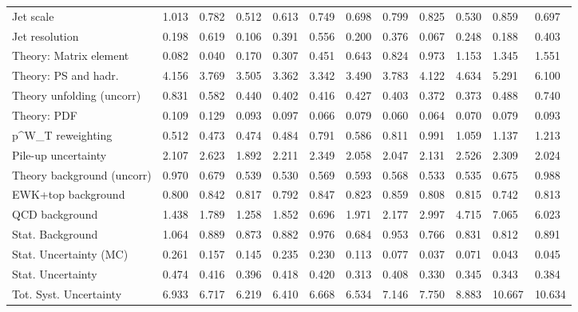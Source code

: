 \begin{tabular}{l|p{0.6cm}p{0.6cm}p{0.6cm}p{0.6cm}p{0.6cm}p{0.6cm}p{0.6cm}p{0.6cm}p{0.6cm}p{0.6cm}p{0.6cm}}
Jet scale                                & 1.013 & 0.782 & 0.512 & 0.613 & 0.749 & 0.698 & 0.799 & 0.825 & 0.530 & 0.859 & 0.697 \\
Jet resolution                           & 0.198 & 0.619 & 0.106 & 0.391 & 0.556 & 0.200 & 0.376 & 0.067 & 0.248 & 0.188 & 0.403 \\
Theory: Matrix element                   & 0.082 & 0.040 & 0.170 & 0.307 & 0.451 & 0.643 & 0.824 & 0.973 & 1.153 & 1.345 & 1.551 \\
Theory: PS and hadr.                     & 4.156 & 3.769 & 3.505 & 3.362 & 3.342 & 3.490 & 3.783 & 4.122 & 4.634 & 5.291 & 6.100 \\
Theory unfolding (uncorr)                & 0.831 & 0.582 & 0.440 & 0.402 & 0.416 & 0.427 & 0.403 & 0.372 & 0.373 & 0.488 & 0.740 \\
Theory: PDF                              & 0.109 & 0.129 & 0.093 & 0.097 & 0.066 & 0.079 & 0.060 & 0.064 & 0.070 & 0.079 & 0.093 \\
p^{W}_{T} reweighting                    & 0.512 & 0.473 & 0.474 & 0.484 & 0.791 & 0.586 & 0.811 & 0.991 & 1.059 & 1.137 & 1.213 \\
Pile-up uncertainty                      & 2.107 & 2.623 & 1.892 & 2.211 & 2.349 & 2.058 & 2.047 & 2.131 & 2.526 & 2.309 & 2.024 \\
Theory background (uncorr)               & 0.970 & 0.679 & 0.539 & 0.530 & 0.569 & 0.593 & 0.568 & 0.533 & 0.535 & 0.675 & 0.988 \\
EWK+top background                       & 0.800 & 0.842 & 0.817 & 0.792 & 0.847 & 0.823 & 0.859 & 0.808 & 0.815 & 0.742 & 0.813 \\
QCD background                           & 1.438 & 1.789 & 1.258 & 1.852 & 0.696 & 1.971 & 2.177 & 2.997 & 4.715 & 7.065 & 6.023 \\
Stat. Background                         & 1.064 & 0.889 & 0.873 & 0.882 & 0.976 & 0.684 & 0.953 & 0.766 & 0.831 & 0.812 & 0.891 \\
Stat. Uncertainty (MC)                   & 0.261 & 0.157 & 0.145 & 0.235 & 0.230 & 0.113 & 0.077 & 0.037 & 0.071 & 0.043 & 0.045 \\
\hline
Stat. Uncertainty                        & 0.474 & 0.416 & 0.396 & 0.418 & 0.420 & 0.313 & 0.408 & 0.330 & 0.345 & 0.343 & 0.384 \\
\hline
Tot. Syst. Uncertainty                   & 6.933 & 6.717 & 6.219 & 6.410 & 6.668 & 6.534 & 7.146 & 7.750 & 8.883 & 10.667 & 10.634 \\
\hline
\end{tabular}
